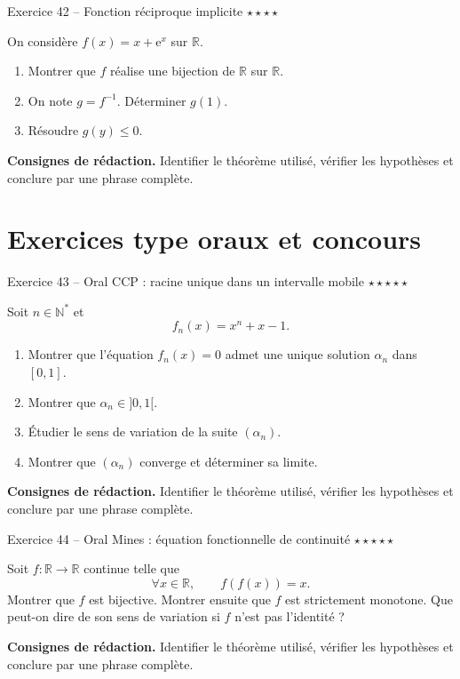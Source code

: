 \documentclass[11pt,a4paper]{article}
\newcommand{\etoiles}[1]{\hfill\textcolor{orangeprepa}{\textbf{#1}}}
\newcommand{\R}{\mathbb{R}}
\newcommand{\N}{\mathbb{N}}
\newcommand{\e}{\mathrm{e}}
\begin{document}
\begin{exobox}{Exercice 42 -- Fonction réciproque implicite \etoiles{$\star\star\star\star$}}

On considère $f(x)=x+\e^x$ sur $\R$.
\begin{enumerate}
\item Montrer que $f$ réalise une bijection de $\R$ sur $\R$.
\item On note $g=f^{-1}$. Déterminer $g(1)$.
\item Résoudre $g(y)\leq0$.
\end{enumerate}

\medskip
\textbf{Consignes de rédaction.} Identifier le théorème utilisé, vérifier les hypothèses et conclure par une phrase complète.
\end{exobox}


\section{Exercices type oraux et concours}
\begin{exobox}{Exercice 43 -- Oral CCP : racine unique dans un intervalle mobile \etoiles{$\star\star\star\star\star$}}

Soit $n\in\N^*$ et
\[
f_n(x)=x^n+x-1.
\]
\begin{enumerate}
\item Montrer que l'équation $f_n(x)=0$ admet une unique solution $\alpha_n$ dans $[0,1]$.
\item Montrer que $\alpha_n\in]0,1[$.
\item Étudier le sens de variation de la suite $(\alpha_n)$.
\item Montrer que $(\alpha_n)$ converge et déterminer sa limite.
\end{enumerate}

\medskip
\textbf{Consignes de rédaction.} Identifier le théorème utilisé, vérifier les hypothèses et conclure par une phrase complète.
\end{exobox}


\begin{exobox}{Exercice 44 -- Oral Mines : équation fonctionnelle de continuité \etoiles{$\star\star\star\star\star$}}

Soit $f:\R\to\R$ continue telle que
\[
\forall x\in\R,\qquad f(f(x))=x.
\]
Montrer que $f$ est bijective. Montrer ensuite que $f$ est strictement monotone. Que peut-on dire de son sens de variation si $f$ n'est pas l'identité ?

\medskip
\textbf{Consignes de rédaction.} Identifier le théorème utilisé, vérifier les hypothèses et conclure par une phrase complète.
\end{exobox}
\end{document}
